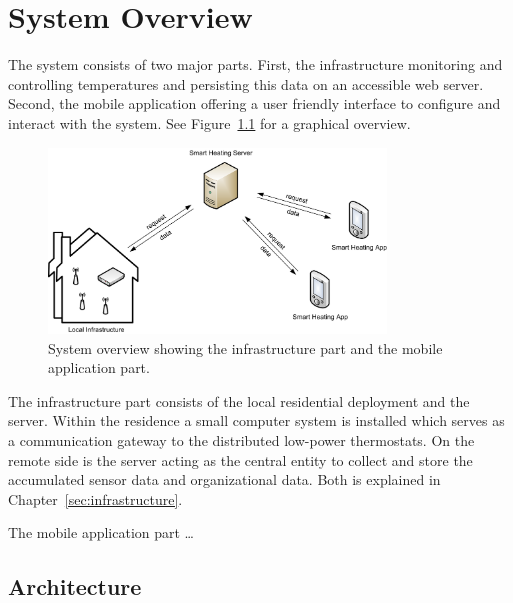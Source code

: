 
\chapter{System Overview}
\label{sec:systemoverview}

The system consists of two major parts.
First, the infrastructure monitoring and controlling temperatures and persisting this data on an accessible web server.
Second, the mobile application offering a user friendly interface to configure and interact with the system.
See Figure~\ref{fig:system_overview} for a graphical overview.

\begin{figure}[h]
\begin{center}
\includegraphics[width=0.8\textwidth]{images/SystemOverview.png}
\end{center}
\caption{System overview showing the infrastructure part and the mobile application part.}
\label{fig:system_overview}
\end{figure}

The infrastructure part consists of the local residential deployment and the server.
Within the residence a small computer system is installed which serves as a communication gateway to the distributed low-power thermostats.
On the remote side is the server acting as the central entity to collect and store the accumulated sensor data and organizational data.
Both is explained in Chapter~\ref{sec:infrastructure}.

The mobile application part \dots
{}


\section{Architecture}

